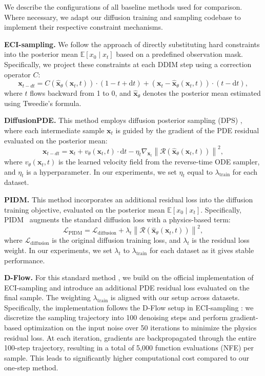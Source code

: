 \documentclass{article}
\theoremstyle{plain}
\theoremstyle{definition}
\theoremstyle{remark}
\def\vx{{\bm{x}}}
\begin{document}
We describe the configurations of all baseline methods used for comparison. Where necessary, we adapt our diffusion training and sampling codebase to implement their respective constraint mechanisms.

\textbf{ECI-sampling.} We follow the approach of directly substituting hard constraints into the posterior mean $\mathbb{E}[x_0 \mid x_t]$ based on a predefined observation mask. Specifically, we project these constraints at each DDIM step \cite{song2021ddim} using a correction operator $C$:
\begin{equation}
\vx_{t - dt} = C(\hat{\vx}_\theta(\vx_t, t)) \cdot (1 - t + \mathrm{d}t) + (\vx_t - \hat{\vx}_\theta(\vx_t, t)) \cdot (t - \mathrm{d}t),
\end{equation}
where $t$ flows backward from 1 to 0, and $\hat{\vx}_\theta$ denotes the posterior mean estimated using Tweedie's formula.

\textbf{DiffusionPDE.} This method employs diffusion posterior sampling (DPS) \cite{chung2022dps}, where each intermediate sample $\vx_t$ is guided by the gradient of the PDE residual evaluated on the posterior mean:
\begin{equation}
\vx_{t - dt} = \vx_t + v_{\theta}(\vx_t, t) \cdot \mathrm{d}t - \eta_t \nabla_{\vx_t} \left\| \mathcal{R}(\hat{\vx}_\theta(\vx_t, t)) \right\|^2,
\end{equation}
where $v_{\theta}(\vx_t, t)$ is the learned velocity field from the reverse-time ODE sampler, and $\eta_t$ is a hyperparameter. In our experiments, we set $\eta_t$ equal to $\lambda_{\text{train}}$ for each dataset.

\textbf{PIDM.} This method incorporates an additional residual loss into the diffusion training objective, evaluated on the posterior mean $\mathbb{E}[x_0 \mid x_t]$. Specifically, PIDM~\cite{bastek2025pdim} augments the standard diffusion loss with a physics-based term:
\begin{equation}
\mathcal{L}_{\text{PIDM}} = \mathcal{L}_{\text{diffusion}} + \lambda_t \left\| \mathcal{R}(\hat{\vx}_\theta(\vx_t, t)) \right\|^2,
\end{equation}
where $\mathcal{L}_{\text{diffusion}}$ is the original diffusion training loss, and $\lambda_t$ is the residual loss weight. In our experiments, we set $\lambda_t$ to $\lambda_{\text{train}}$ for each dataset as it gives stable performance.

\textbf{D-Flow.} For this standard method \cite{ben2024dflow}, we build on the official implementation of ECI-sampling \cite{cheng2025eci} and introduce an additional PDE residual loss evaluated on the final sample. The weighting $\lambda_{\text{train}}$ is aligned with our setup across datasets. Specifically, the implementation follows the D-Flow setup in ECI-sampling \cite{cheng2025eci}: we discretize the sampling trajectory into 100 denoising steps and perform gradient-based optimization on the input noise over 50 iterations to minimize the physics residual loss. At each iteration, gradients are backpropagated through the entire 100-step trajectory, resulting in a total of 5,000 function evaluations (NFE) per sample. This leads to significantly higher computational cost compared to our one-step method.
\end{document}
